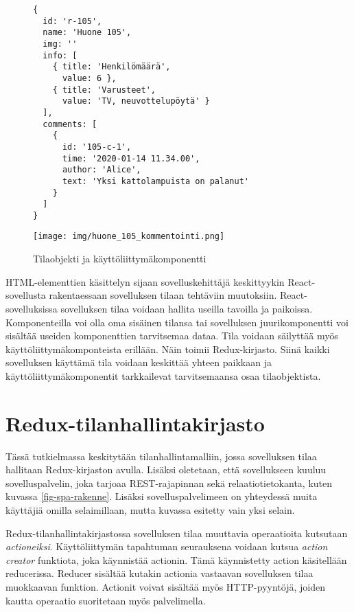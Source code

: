 \documentclass[finnish,twoside,censored,csm,sw-track-2018]{HYthesisML}
\begin{document}
\begin{figure}[ht]
\begin{minipage}{.5\textwidth}
  \begin{Verbatim}[fontsize=\scriptsize]
{
  id: 'r-105',
  name: 'Huone 105',
  img: ''
  info: [
    { title: 'Henkilömäärä', 
      value: 6 },
    { title: 'Varusteet', 
      value: 'TV, neuvottelupöytä' }
  ],
  comments: [
    {
      id: '105-c-1',
      time: '2020-01-14 11.34.00',
      author: 'Alice',
      text: 'Yksi kattolampuista on palanut'
    }
  ]
}
\end{Verbatim}
\end{minipage}%
\begin{minipage}{.5\textwidth}
  \begin{center}
    \texttt{[image: img/huone\_105\_kommentointi.png]}
  \end{center}
\end{minipage}%
\caption{Tilaobjekti ja käyttöliittymäkomponentti}
\label{fig-react-tila-ja-komponentti}
\end{figure}

HTML-elementtien käsittelyn sijaan sovelluskehittäjä keskittyykin React-sovellusta rakentaessaan sovelluksen tilaan tehtäviin muutoksiin. React-sovelluksissa sovelluksen tilaa voidaan hallita useilla tavoilla ja paikoissa. Komponenteilla voi olla oma sisäinen tilansa tai sovelluksen juurikomponentti voi sisältää useiden komponenttien tarvitsemaa dataa. Tila voidaan säilyttää myös käyttöliittymäkomponteista erillään. Näin toimii Redux-kirjasto. Siinä kaikki sovelluksen käyttämä tila voidaan keskittää yhteen paikkaan ja käyttöliittymäkomponentit tarkkailevat tarvitsemaansa osaa tilaobjektista. 

\section{Redux-tilanhallintakirjasto}
\label{spa-toimintaperiaate}

Tässä tutkielmassa keskitytään tilanhallintamalliin, jossa sovelluksen tilaa hallitaan Redux-kirjaston \citep{redux} avulla. Lisäksi oletetaan, että sovellukseen kuuluu sovelluspalvelin, joka tarjoaa REST-rajapinnan sekä relaatiotietokanta, kuten kuvassa \ref{fig-spa-rakenne}. Lisäksi sovelluspalvelimeen on yhteydessä muita käyttäjiä omilla selaimillaan, mutta kuvassa esitetty vain yksi selain.

Redux-tilanhallintakirjastossa sovelluksen tilaa muuttavia operaatioita kutsutaan \textit{actioneiksi}. Käyttöliittymän tapahtuman seurauksena voidaan kutsua \textit{action creator} funktiota, joka käynnistää {actionin}. Tämä käynnistetty action käsitellään reducerissa. Reducer sisältää kutakin actionia vastaavan sovelluksen tilaa muokkaavan funktion. Actionit voivat sisältää myös HTTP-pyyntöjä, joiden kautta operaatio suoritetaan myös palvelimella.
\end{document}
